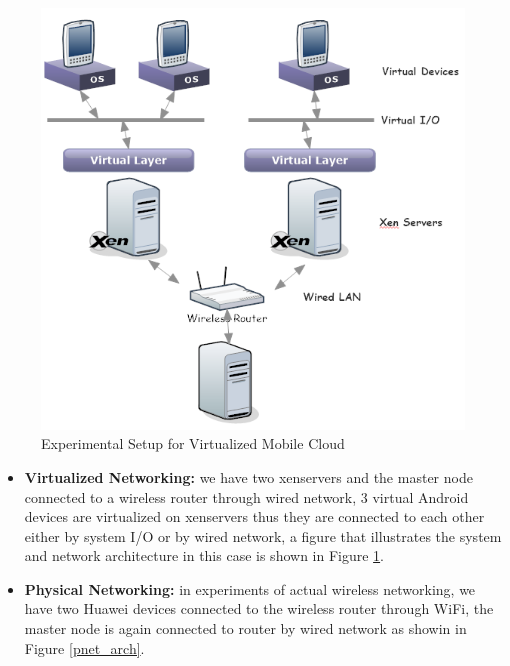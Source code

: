 \documentclass[journal,comsoc]{IEEEtran}
\begin{document}
\begin{figure}[htbp]
\begin{center}
\includegraphics[width=0.8\linewidth]{vnet_arch.png} 
\end{center}	   
\caption{Experimental Setup for Virtualized Mobile Cloud}\label{vnet_arch}
\end{figure}

\begin{itemize}
	\item {\bf Virtualized Networking: }we have two xenservers and the master node connected to a wireless router through wired network, 3 virtual Android devices are virtualized on xenservers thus they are connected to each other either by system I/O or by wired network, a figure that illustrates the system and network architecture in this case is shown in Figure \ref{vnet_arch}.
	\item {\bf Physical Networking: }in experiments of actual wireless networking, we have two Huawei devices connected to the wireless router through WiFi, the master node is again connected to router by wired network as showin in Figure \ref{pnet_arch}.
\end{itemize}
\end{document}

